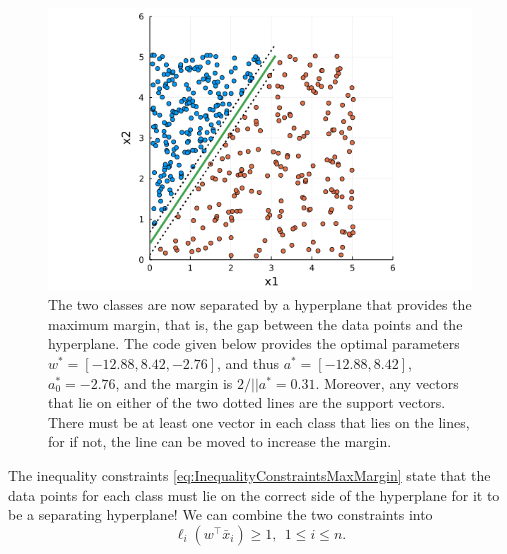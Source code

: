 \begin{figure}[t]%
\centering
\includegraphics[width=0.95\columnwidth]{graphics/Chap13SeparatingHyperplanes/MaxMarginClassifierDataProcessed.png}%
\caption[]{The two classes are now separated by a hyperplane that provides the maximum margin, that is, the gap between the data points and the hyperplane. The code given below provides the optimal parameters $w^\ast = [-12.88, 8.42, -2.76]$, and thus $a^\ast = [-12.88, 8.42] $, $a_0^\ast = -2.76$, and the margin is $ 2 /||a^\ast = 0.31$. Moreover, any vectors that lie on either of the two dotted lines are the support vectors. There must be at least one vector in each class that lies on the lines, for if not, the line can be moved to increase the margin.
}    
\label{fig:max_margin_dataPresentation}
\end{figure}

The inequality constraints \eqref{eq:InequalityConstraintsMaxMargin} state that the data points for each class must lie on the correct side of the hyperplane for it to be a separating hyperplane! We can combine the two constraints into
\begin{equation}
\label{eq:MaxMarginCommonConstraint}
       \ell_i(w^\top \bar{x}_i) \geq 1, ~~1 \le i \le n.
\end{equation}
 

